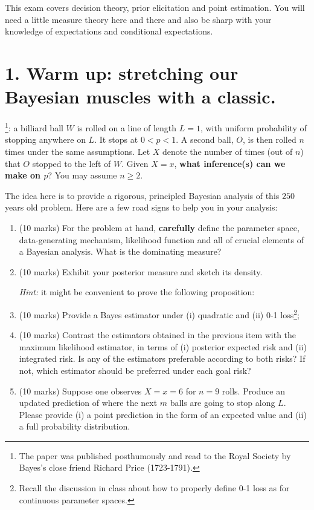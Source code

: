 \documentclass[a4paper,10pt, notitlepage]{report}
\begin{document}
This exam covers decision theory, prior elicitation and  point estimation.
You will need a little measure theory here and there and also be sharp with your knowledge of expectations and conditional expectations.

\section*{1. Warm up: stretching our Bayesian muscles with a classic.}

\cite{Bayes1763}\footnote{The paper was published posthumously and read to the Royal Society by Bayes's close friend Richard Price (1723-1791).}: a billiard ball $W$ is rolled on a line of length $L = 1$, with uniform probability of stopping anywhere on $L$. 
It stops at $0 < p < 1$.
A second ball, $O$, is then rolled $n$ times under the same assumptions.
Let $X$ denote the number of times (out of $n$) that $O$ stopped to the left of $W$.
Given $X=x$, \textbf{what inference(s) can we make on $p$}?
You may assume $n\geq2$.

The idea here is to provide a rigorous, principled Bayesian analysis of this $250$ years old problem.
Here are a few road signs to help you in your analysis:
\begin{enumerate}[label=\alph*)]
 \item (10 marks) For the problem at hand, \textbf{carefully} define the parameter space, data-generating mechanism, likelihood function and all of crucial elements of a Bayesian analysis. What is the dominating measure?
 


 \item (10 marks) Exhibit your posterior measure and sketch its density.
 
 \textit{Hint:} it might be convenient to prove the following proposition:

 

 \item (10 marks) Provide a Bayes estimator under (i) quadratic and (ii) 0-1 loss\footnote{Recall the discussion in class about how to properly define 0-1 loss as for continuous parameter spaces.
 };

 
 
 \item (10 marks) Contrast the estimators obtained in the previous item  with
 the maximum likelihood estimator, in terms of (i) posterior expected risk and (ii)
 integrated risk.
 Is any of the estimators preferable according to both risks?
 If not, which estimator should be preferred under each goal risk?

 

 \item (10 marks) Suppose one observes $X = x = 6$ for $n=9$ rolls.
 Produce an updated prediction of where the next $m$ balls are going to stop along $L$.
 Please provide (i) a point prediction in the form of an expected value and
 (ii) a full probability distribution.
 
 

\end{enumerate}
\end{document}
